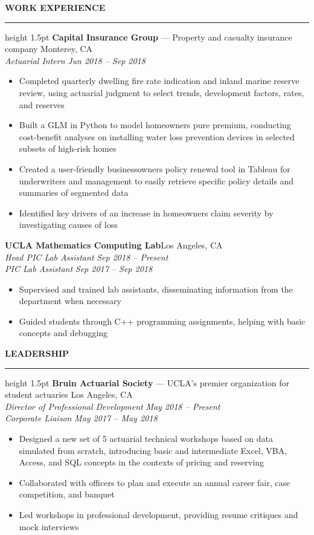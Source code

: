\documentclass[11pt,letterpaper]{article}
\newcommand{\sectline}{\vspace{3pt}\hrule height 1.5pt\vspace{3pt}}
\newcommand{\sectspace}{\vspace{8pt}}
\newcommand{\smallspace}{\vspace{4pt}}
\begin{document}
\textbf{WORK EXPERIENCE}\sectline
\textbf{Capital Insurance Group} --- Property and casualty insurance company \hfill Monterey, CA \\
\textit{Actuarial Intern} \hfill \textit{Jun 2018 -- Sep 2018}
\begin{itemize}
	\item Completed quarterly dwelling fire rate indication and inland marine reserve review, using actuarial judgment to select trends, development factors, rates, and reserves
	\item Built a GLM in Python to model homeowners pure premium, conducting cost-benefit analyses on installing water loss prevention devices in selected subsets of high-risk homes 
	\item Created a user-friendly businessowners policy renewal tool in Tableau for underwriters and management to easily retrieve specific policy details and summaries of segmented data
	\item Identified key drivers of an increase in homeowners claim severity by investigating causes of loss
\end{itemize}
\smallspace 
\textbf{UCLA Mathematics Computing Lab}\hfill Los Angeles, CA \\
\textit{Head PIC Lab Assistant} \hfill \textit{Sep 2018 -- Present} \\
\textit{PIC Lab Assistant} \hfill \textit{Sep 2017 -- Sep 2018}
\begin{itemize}
	\item Supervised and trained lab assistants, disseminating information from the department when necessary
	\item Guided students through C++ programming assignments, helping with basic concepts and debugging
\end{itemize}
\sectspace


\textbf{LEADERSHIP} \sectline
\textbf{Bruin Actuarial Society} --- UCLA's premier organization for student actuaries \hfill Los Angeles, CA \\
\textit{Director of Professional Development} \hfill \textit{May 2018 -- Present} \\
\textit{Corporate Liaison} \hfill \textit{May 2017 -- May 2018}
\begin{itemize}
	\item Designed a new set of 5 actuarial technical workshops based on data simulated from scratch, introducing basic and intermediate Excel, VBA, Access, and SQL concepts in the contexts of pricing and reserving
	\item Collaborated with officers to plan and execute an annual career fair, case competition, and banquet
	\item Led workshops in professional development, providing resume critiques and mock interviews
\end{itemize}
\sectspace
\end{document}
